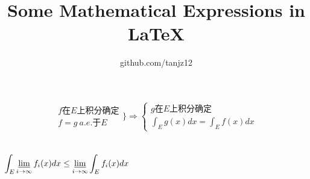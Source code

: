 \documentclass{article}
\title{Some Mathematical Expressions in LaTeX}
\author{github.com/tanjz12}
\begin{document}
\maketitle

\section{}

$$\begin{matrix}
f在E上积分确定\\
f=g\ a.e.于E
\end{matrix}
\Bigg\}
\Rightarrow
\begin{cases}
g在E上积分确定\\
\int_E g(x)dx=\int_E f(x)dx
\end{cases}$$

\section{}

$\displaystyle\int_E \displaystyle\varliminf_{i\rightarrow\infty}f_i(x)dx\leq \displaystyle\varliminf_{i\rightarrow\infty} \int_E f_i(x)dx$
\end{document}
